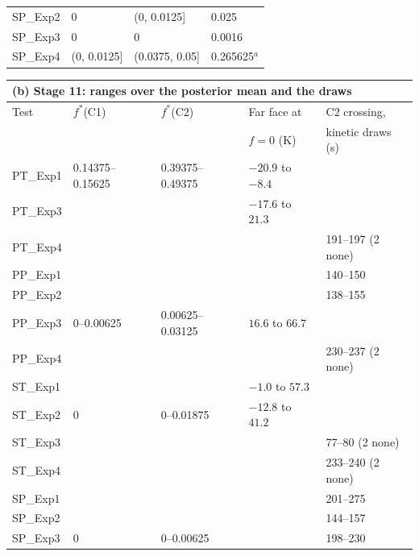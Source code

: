 \documentclass[preprint,12pt]{elsarticle}
\begin{document}
\begin{table}[p]
\begin{tabular}{llll}
SP\_Exp2 & 0 & (0, 0.0125] & 0.025 \\
SP\_Exp3 & 0 & 0 & 0.0016 \\
SP\_Exp4 & (0, 0.0125] & (0.0375, 0.05] & 0.265625$^{a}$ \\
\bottomrule
\end{tabular}
\par\bigskip
\begin{tabular}{lllll}
\multicolumn{5}{l}{(b) Stage 11: ranges over the posterior mean and the draws} \\
\toprule
Test & $f^*$(C1) & $f^*$(C2) & Far face at & C2 crossing, \\
 & & & $f=0$ (K) & kinetic draws (s) \\
\midrule
PT\_Exp1 & 0.14375--0.15625 & 0.39375--0.49375 & $-20.9$ to $-8.4$ &  \\
PT\_Exp3 &  &  & $-17.6$ to $21.3$ &  \\
PT\_Exp4 &  &  &  & 191--197 (2 none) \\
PP\_Exp1 &  &  &  & 140--150 \\
PP\_Exp2 &  &  &  & 138--155 \\
PP\_Exp3 & 0--0.00625 & 0.00625--0.03125 & $16.6$ to $66.7$ &  \\
PP\_Exp4 &  &  &  & 230--237 (2 none) \\
ST\_Exp1 &  &  & $-1.0$ to $57.3$ &  \\
ST\_Exp2 & 0 & 0--0.01875 & $-12.8$ to $41.2$ &  \\
ST\_Exp3 &  &  &  & 77--80 (2 none) \\
ST\_Exp4 &  &  &  & 233--240 (2 none) \\
SP\_Exp1 &  &  &  & 201--275 \\
SP\_Exp2 &  &  &  & 144--157 \\
SP\_Exp3 & 0 & 0--0.00625 &  & 198--230 \\
\bottomrule
\end{tabular}
\end{table}
\end{document}
